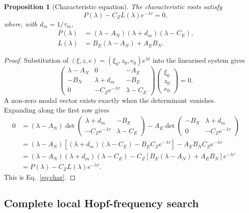\documentclass[11pt]{article}
\newtheorem{proposition}{Proposition}
\begin{document}
\begin{proposition}[Characteristic equation]
The characteristic roots satisfy
\begin{equation}
P(\lambda)-C_ZL(\lambda)e^{-\lambda\tau}=0,
\label{eq:char}
\end{equation}
where, with $d_m=1/\tau_m$,
\begin{align}
P(\lambda)&=(\lambda-A_N)(\lambda+d_m)(\lambda-C_E),\\
L(\lambda)&=B_E(\lambda-A_N)+A_EB_N.
\end{align}
\end{proposition}

\begin{proof}
Substitution of $(\xi,z,e)=(\xi_0,z_0,e_0)e^{\lambda t}$ into the linearised system gives
\[
\begin{pmatrix}
\lambda-A_N&0&-A_E\\
-B_N&\lambda+d_m&-B_E\\
0&-C_Ze^{-\lambda\tau}&\lambda-C_E
\end{pmatrix}
\begin{pmatrix}\xi_0\\z_0\\e_0\end{pmatrix}=0.
\]
A non-zero modal vector exists exactly when the determinant vanishes. Expanding along the first row gives
\begin{align*}
0
&=(\lambda-A_N)
 \det\begin{pmatrix}
 \lambda+d_m&-B_E\\
 -C_Ze^{-\lambda\tau}&\lambda-C_E
 \end{pmatrix}
 -A_E
 \det\begin{pmatrix}
 -B_N&\lambda+d_m\\
 0&-C_Ze^{-\lambda\tau}
 \end{pmatrix}\\
&=(\lambda-A_N)
 \left[(\lambda+d_m)(\lambda-C_E)-B_EC_Ze^{-\lambda\tau}\right]
 -A_EB_NC_Ze^{-\lambda\tau}\\
&=(\lambda-A_N)(\lambda+d_m)(\lambda-C_E)
 -C_Z\left[B_E(\lambda-A_N)+A_EB_N\right]e^{-\lambda\tau}\\
&=P(\lambda)-C_ZL(\lambda)e^{-\lambda\tau}.
\end{align*}
This is Eq.~\eqref{eq:char}.
\end{proof}

\subsection{Complete local Hopf-frequency search}
\end{document}
